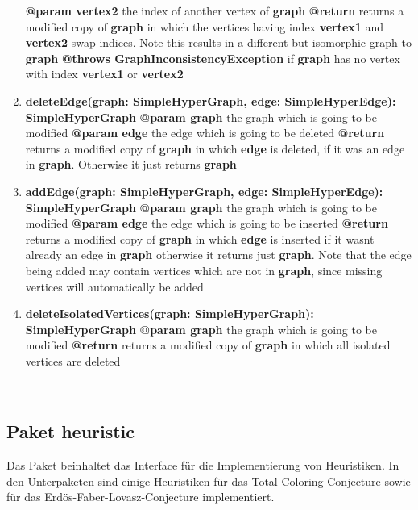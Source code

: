 \documentclass{article}
\newcommand{\mypackage}[1]{\subsection*{Paket #1} \label{#1} \addcontentsline{toc}{subsection}{\nameref{#1}}}
\begin{document}
\begin{enumerate}[+]
{			\textbf{@param vertex2} the index of another vertex of \textbf{graph} \newline
			\textbf{@return} returns a modified copy of \textbf{graph} in which the vertices having index \textbf{vertex1} and \textbf{vertex2} swap indices. Note this results in a different but isomorphic graph to \textbf{graph}  \newline
			\textbf{@throws GraphInconsistencyException} if \textbf{graph} has no vertex with index \textbf{vertex1} or \textbf{vertex2} 
		}
		\item{
			\textbf{deleteEdge(graph: SimpleHyperGraph, edge: SimpleHyperEdge): SimpleHyperGraph} \newline
			\textbf{@param graph} the graph which is going to be modified \newline
			\textbf{@param edge} the edge which is going to be deleted \newline
			\textbf{@return} returns a modified copy of \textbf{graph} in which \textbf{edge} is deleted, if it was an edge in \textbf{graph}. Otherwise it just returns \textbf{graph}
		}
		
		\item{
			\textbf{addEdge(graph: SimpleHyperGraph, edge: SimpleHyperEdge): SimpleHyperGraph} \newline
			\textbf{@param graph} the graph which is going to be modified \newline
			\textbf{@param edge} the edge which is going to be inserted \newline
			\textbf{@return} returns a modified copy of \textbf{graph} in which \textbf{edge} is inserted if it wasnt already an edge in \textbf{graph} otherwise it returns just \textbf{graph}. Note that the edge being added may contain vertices which are not in \textbf{graph}, since missing vertices will automatically be added
		}
		\item{
			\textbf{deleteIsolatedVertices(graph: SimpleHyperGraph): SimpleHyperGraph} \newline
			\textbf{@param graph} the graph which is going to be modified \newline
			\textbf{@return} returns a modified copy of \textbf{graph} in which all isolated vertices are deleted		}
	\end{enumerate}
	
	~\newpage
	
	\mypackage{heuristic}
	Das Paket beinhaltet das Interface für die Implementierung von Heuristiken. In den Unterpaketen sind einige Heuristiken für das Total-Coloring-Conjecture sowie für das Erdös-Faber-Lovasz-Conjecture implementiert.
	
\end{document}
